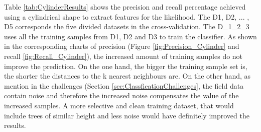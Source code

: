 \documentclass{subfiles}
\begin{document}
   \par Table \ref{tab:CylinderResults} shows the precision and recall percentage achieved using a cylindrical shape to extract features for the likelihood.  The D1, D2, ... , D5 corresponds the five divided datasets in the cross-validation. The D\_1\_2\_3 uses all the training samples from D1, D2 and D3 to train the classifier. As shown in the corresponding charts  of precision (Figure \ref{fig:Precision_Cylinder} and recall \ref{fig:Recall_Cylinder}), the increased amount of training samples do not improve the prediction. On the one hand, the bigger the training sample set is, the shorter the distances to the k nearest neighbours are. On the other hand, as mention in the challenges (Section \ref{sec:ClassficationChallenges}, the field data contain noise and therefore the increased noise compensates the value of the increased samples. A more selective and clean training dataset, that would include trees of similar height and less noise would have definitely improved the results. 
   
\end{document}
